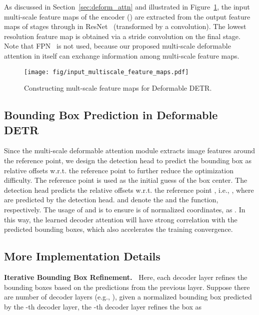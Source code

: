 \documentclass{article}
\begin{document}
As discussed in Section~\ref{sec:deform_attn} and illustrated in Figure~\ref{fig:build_ms_feature}, the input multi-scale feature maps of the encoder  () are extracted from the output feature maps of stages  through  in ResNet~\citep{he2016deep} (transformed by a  convolution). The lowest resolution feature map  is obtained via a  stride  convolution on the final  stage. Note that FPN~\citep{lin2017feature} is not used, because our proposed multi-scale deformable attention in itself can exchange information among multi-scale feature maps.

\begin{figure}[ht]
\begin{center}
  \texttt{[image: fig/input\_multiscale\_feature\_maps.pdf]}
\end{center}
\caption{Constructing mult-scale feature maps for Deformable DETR.}
\label{fig:build_ms_feature}
\end{figure}

\subsection{Bounding Box Prediction in Deformable DETR}
\label{sec:bbox_pred}

Since the multi-scale deformable attention module extracts image features around the reference point, we design the detection head to predict the bounding box as relative offsets w.r.t. the reference point to further reduce the optimization difficulty. The reference point is used as the initial guess of the box center. The detection head predicts the relative offsets w.r.t. the reference point , i.e., , where  are predicted by the detection head.  and  denote the  and the  function, respectively. The usage of  and  is to ensure  is of normalized coordinates, as .
In this way, the learned decoder attention will have strong correlation with the predicted bounding boxes, which also accelerates the training convergence.


\subsection{More Implementation Details}
\label{sec:imp_details}

\textbf{Iterative Bounding Box Refinement.~}
Here, each decoder layer refines the bounding boxes based on the predictions from the previous layer. Suppose there are  number of decoder layers (e.g., ), given a normalized bounding box  predicted by the -th decoder layer, the -th decoder layer refines the box as 
\end{document}

